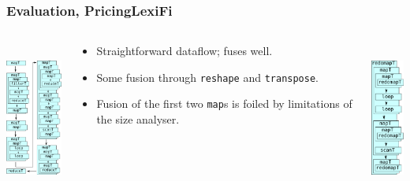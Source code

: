 \documentclass{beamer}
\begin{document}
\begin{frame}
  \frametitle{Evaluation, PricingLexiFi}

\begin{columns}
\begin{column}{0.2\textwidth}
  \includegraphics[height=5cm]{img/PricingLexiFi-unfused.pdf}
\end{column}
\begin{column}{0.6\textwidth}
\begin{itemize}
\item Straightforward dataflow; fuses well.
  \item Some fusion through \texttt{reshape} and \texttt{transpose}.
  \item Fusion of the first two \texttt{map}s is foiled by limitations
    of the size analyser.
\end{itemize}
\end{column}
\begin{column}{0.2\textwidth}
  \includegraphics[height=5cm]{img/PricingLexiFi-fused.pdf}
\end{column}
\end{columns}

\end{frame}
\end{document}
